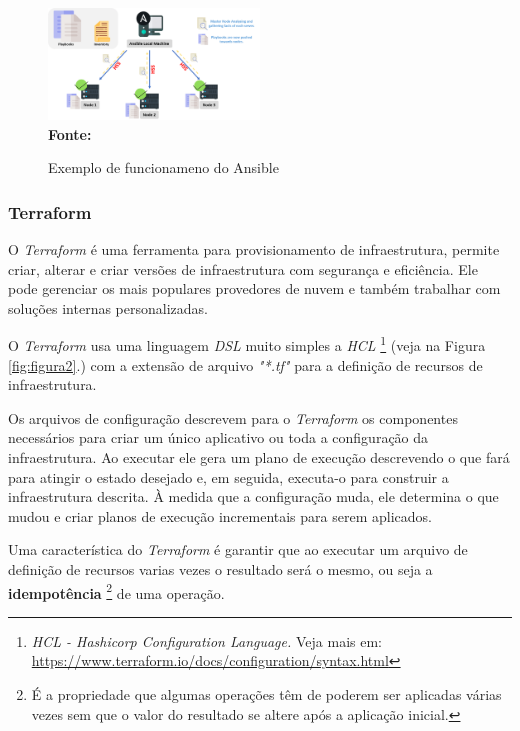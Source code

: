  \begin{figure}[ht]
	\centering	
	\caption[\hspace{0.1cm}Exemplo de funcionameno do Ansible]{Exemplo de funcionameno do Ansible}
	\vspace{-0.4cm}
	\includegraphics[width=0.5\textwidth]{figuras/ansible-working.png}
	 \vspace{-0.2cm}
	\\\textbf{\footnotesize Fonte: \cite{intellipaat}}
	\label{fig:figura6}
\end{figure}
\vspace{-0.5cm}

\subsubsection{Terraform} 

 O \textit{Terraform} é uma ferramenta para provisionamento de infraestrutura, permite criar, alterar e criar versões de infraestrutura com segurança e eficiência. Ele pode gerenciar os mais populares provedores de nuvem e também trabalhar com soluções internas personalizadas.

O \textit{Terraform} usa uma linguagem \textit{DSL} muito simples a \textit{HCL} \footnote{\textit{HCL - Hashicorp Configuration Language.} Veja mais em: \href{https://www.terraform.io/docs/configuration/syntax.html}{https://www.terraform.io/docs/configuration/syntax.html} } (veja na Figura \ref{fig:figura2}.) com a extensão de arquivo \textit{"*.tf"} para a definição de recursos de infraestrutura. 

Os arquivos de configuração descrevem para o \textit{Terraform} os componentes necessários para criar um único aplicativo ou toda a configuração da infraestrutura. Ao executar ele gera um plano de execução descrevendo o que fará para atingir o estado desejado e, em seguida, executa-o para construir a infraestrutura descrita. 
À medida que a configuração muda, ele determina o que mudou e criar planos de execução incrementais para serem aplicados.

Uma característica do \textit{Terraform} é garantir que ao executar um arquivo de definição de recursos varias vezes o resultado será o mesmo, ou seja a \textbf{idempotência} \footnote{É a propriedade que algumas operações têm de poderem ser aplicadas várias vezes sem que o valor do resultado se altere após a aplicação inicial.} de uma operação.

